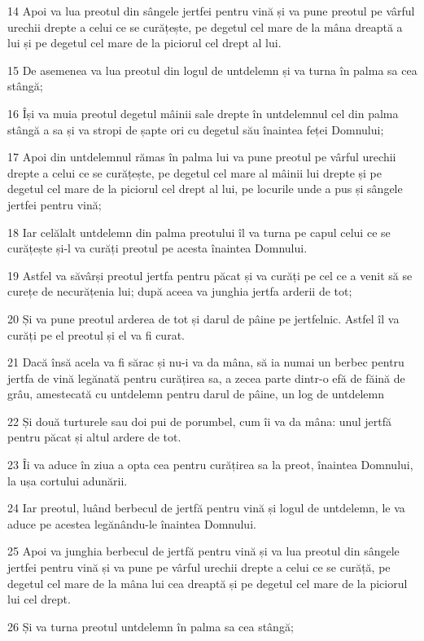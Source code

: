 \par 14 Apoi va lua preotul din sângele jertfei pentru vină și va pune preotul pe vârful urechii drepte a celui ce se curățește, pe degetul cel mare de la mâna dreaptă a lui și pe degetul cel mare de la piciorul cel drept al lui.
\par 15 De asemenea va lua preotul din logul de untdelemn și va turna în palma sa cea stângă;
\par 16 Își va muia preotul degetul mâinii sale drepte în untdelemnul cel din palma stângă a sa și va stropi de șapte ori cu degetul său înaintea feței Domnului;
\par 17 Apoi din untdelemnul rămas în palma lui va pune preotul pe vârful urechii drepte a celui ce se curățește, pe degetul cel mare al mâinii lui drepte și pe degetul cel mare de la piciorul cel drept al lui, pe locurile unde a pus și sângele jertfei pentru vină;
\par 18 Iar celălalt untdelemn din palma preotului îl va turna pe capul celui ce se curățește și-l va curăți preotul pe acesta înaintea Domnului.
\par 19 Astfel va săvârși preotul jertfa pentru păcat și va curăți pe cel ce a venit să se curețe de necurățenia lui; după aceea va junghia jertfa arderii de tot;
\par 20 Și va pune preotul arderea de tot și darul de pâine pe jertfelnic. Astfel îl va curăți pe el preotul și el va fi curat.
\par 21 Dacă însă acela va fi sărac și nu-i va da mâna, să ia numai un berbec pentru jertfa de vină legănată pentru curățirea sa, a zecea parte dintr-o efă de făină de grâu, amestecată cu untdelemn pentru darul de pâine, un log de untdelemn
\par 22 Și două turturele sau doi pui de porumbel, cum îi va da mâna: unul jertfă pentru păcat și altul ardere de tot.
\par 23 Îi va aduce în ziua a opta cea pentru curățirea sa la preot, înaintea Domnului, la ușa cortului adunării.
\par 24 Iar preotul, luând berbecul de jertfă pentru vină și logul de untdelemn, le va aduce pe acestea legănându-le înaintea Domnului.
\par 25 Apoi va junghia berbecul de jertfă pentru vină și va lua preotul din sângele jertfei pentru vină și va pune pe vârful urechii drepte a celui ce se curăță, pe degetul cel mare de la mâna lui cea dreaptă și pe degetul cel mare de la piciorul lui cel drept.
\par 26 Și va turna preotul untdelemn în palma sa cea stângă;

